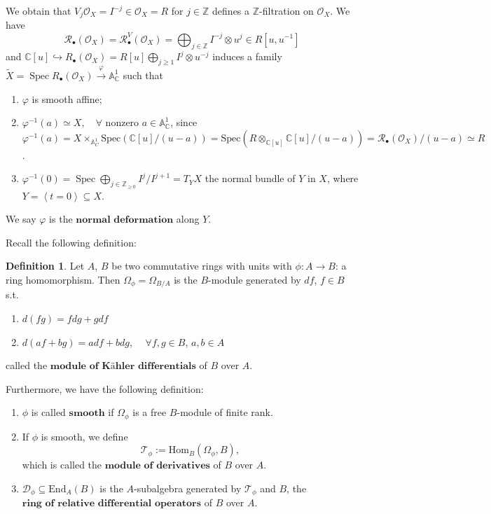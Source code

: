 \documentclass[openany]{book}
\theoremstyle{definition} %
\newtheorem{definition}[theorem]{Definition} %
\theoremstyle{remark}
\begin{document}
We obtain that $V_{j} \mathcal{O}_X = I^{-j} \in \mathcal{O}_X = R$ for $j \in \mathbb{Z}$ defines a $\mathbb{Z}$-filtration on $\mathcal{O}_X$.
We have
$$\mathcal{R}_{\bullet}(\mathcal{O}_X) = \mathcal{R}^V_{\bullet}(\mathcal{O}_X) = \bigoplus_{j \in \mathbb{Z}} I^{-j} \otimes u^j \in R[u, u^{-1}]$$
and $\mathbb{C}[u] \hookrightarrow R_{\bullet}(\mathcal{O}_X)=R[u]\bigoplus\limits_{j\ge 1}I^{j}\otimes u^{-j}$ induces a family $\widetilde{X}= \operatorname{Spec} R_{\bullet}(\mathcal{O}_X)\xrightarrow{\varphi}\mathbb{A}^{1}_{\mathbb{C}}$ such that
\begin{enumerate}
    \item $\varphi$ is smooth affine;
    \item  $\varphi^{-1}(a) \simeq X, \quad \forall \text{ nonzero } a \in \mathbb{A}^1_{\mathbb{C}}$, since $\varphi ^{-1}(a)=X\times_{\mathbb{A}^{1}_{C}}\mathrm{Spec}(\mathbb{C}[u] /(u-a))=\mathrm{Spec}(R\otimes_{\mathbb{C}[u]}\mathbb{C}[u] /(u-a))=\mathcal{R}_{\bullet}(\mathcal{O}_{X}) /(u-a)\simeq R$.
    \item $\varphi^{-1}(0) = \operatorname{Spec} \bigoplus\limits_{j \in \mathbb{Z}_{\geq 0}} I^j/I^{j+1} = T_Y X$ the normal bundle of $Y$ in $X$, where $Y = \left<  t = 0\right> \subseteq X$.

\end{enumerate}

We say $\varphi$ is the $\textbf{normal deformation}$ along $Y$.

Recall the following definition:

\begin{definition}
    Let $A$, $B$ be two commutative rings with units with $\phi: A \to B$: a ring homomorphism. Then $\Omega_{\phi} = \Omega_{B/A}$ is the $B$-module generated by $df$, $f \in B$ s.t.
    \begin{enumerate}
        \item  $d(fg) = fdg + gdf$
        \item $d(af + bg) = adf + bdg$, $\quad \forall f,g \in B$, $a,b \in A$
    \end{enumerate}
    called the $\textbf{module of Kähler differentials}$ of $B$ over $A$.

    Furthermore, we have the following definition:
    \begin{enumerate}
        \item  $\phi$ is called $\textbf{smooth}$ if $\Omega_{\phi}$ is a free $B$-module of finite rank.
        \item If $\phi$ is smooth, we define $$\mathcal{T}_{\phi} := \mathrm{Hom}_B(\Omega_{\phi}, B),$$which is called the $\textbf{module of derivatives}$ of $B$ over $A$.
        \item $\mathcal{D}_{\phi} \subseteq \mathrm{End}_A(B)$ is the $A$-subalgebra generated by $\mathcal{T}_{\phi}$ and $B$, the $\textbf{ring of relative differential operators}$ of $B$ over $A$.
    \end{enumerate}

\end{definition}
\end{document}
